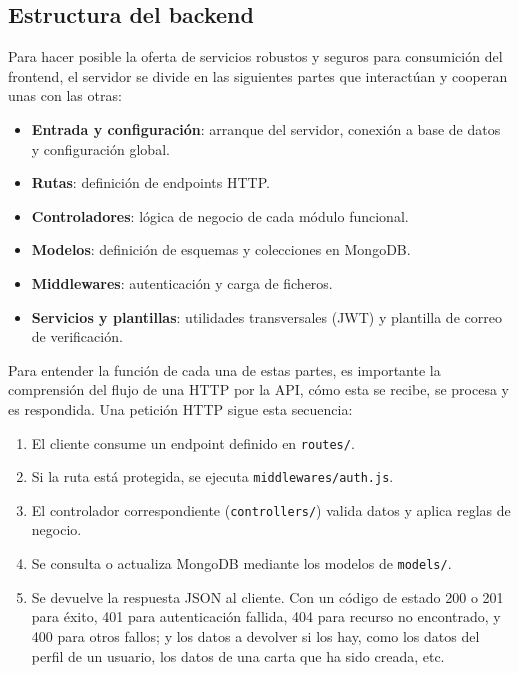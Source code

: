 \subsection{Estructura del backend}


Para hacer posible la oferta de servicios robustos y seguros para consumición del frontend, el servidor se divide en las siguientes partes que interactúan y cooperan unas con las otras:

\begin{itemize}
    \item \textbf{Entrada y configuración}: arranque del servidor, conexión a base de datos y configuración global.
    \item \textbf{Rutas}: definición de endpoints HTTP.
    \item \textbf{Controladores}: lógica de negocio de cada módulo funcional.
    \item \textbf{Modelos}: definición de esquemas y colecciones en MongoDB.
    \item \textbf{Middlewares}: autenticación y carga de ficheros.
    \item \textbf{Servicios y plantillas}: utilidades transversales (JWT) y plantilla de correo de verificación.
\end{itemize}

Para entender la función de cada una de estas partes, es importante la comprensión del flujo de una HTTP por la API, cómo esta se recibe, se procesa y es respondida. Una petición HTTP sigue esta secuencia:

\begin{enumerate}
    \item El cliente consume un endpoint definido en \texttt{routes/}.
    \item Si la ruta está protegida, se ejecuta \texttt{middlewares/auth.js}.
    \item El controlador correspondiente (\texttt{controllers/}) valida datos y aplica reglas de negocio.
    \item Se consulta o actualiza MongoDB mediante los modelos de \texttt{models/}.
    \item Se devuelve la respuesta JSON al cliente. Con un código de estado 200 o 201 para éxito, 401 para autenticación fallida, 404 para recurso no encontrado, y 400 para otros fallos; y los datos a devolver si los hay, como los datos del perfil de un usuario, los datos de una carta que ha sido creada, etc.
\end{enumerate}


